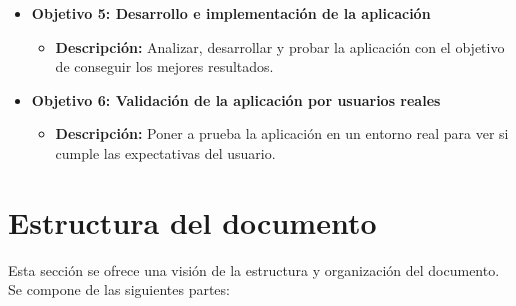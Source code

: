 \begin{itemize}
	\item \textbf{Objetivo 5: Desarrollo e implementación de la aplicación}
	\begin{itemize}
		\item \textbf{Descripción:} Analizar, desarrollar y probar la aplicación con el objetivo de conseguir los mejores resultados.
	\end{itemize}
	
	\item \textbf{Objetivo 6: Validación de la aplicación por usuarios reales}
	\begin{itemize}
		\item \textbf{Descripción:} Poner a prueba la aplicación en un entorno real para ver si cumple las expectativas del usuario.
	\end{itemize}
\end{itemize}

\section{Estructura del documento}
\label{sec:document_structure}
Esta sección se ofrece una visión de la estructura y organización del documento. Se compone de las siguientes partes: 


